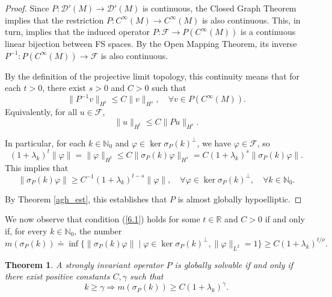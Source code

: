 \documentclass{amsart}
\newtheorem{theorem}{Theorem}[section]
\theoremstyle{definition}
\theoremstyle{remark}
\numberwithin{equation}{section}
\begin{document}
\begin{proof}
		Since $P:\mathscr{D}'(M)\to\mathscr{D}'(M)$ is continuous, the Closed Graph Theorem implies that the restriction $P:C^\infty(M)\to C^\infty(M)$ is also continuous. This, in turn, implies that the induced operator $P:\mathcal{F}\to P(C^\infty(M))$ is a continuous linear bijection between FS spaces. By the Open Mapping Theorem, its inverse  $P^{-1}: P(C^\infty(M))\to\mathcal{F}$ is also continuous.  
		
		By the definition of the projective limit topology, this continuity means that for each $t>0$, there exist $s>0$ and $C>0$ such that
		\begin{equation*}
			\|P^{-1}v\|_{H^t}\leq C\|v\|_{H^s},\quad \forall v\in P(C^\infty(M)).
		\end{equation*}
		Equivalently, for all $u\in\mathcal{F}$,
		\begin{equation*}
			\|u\|_{H^t}\leq C\|Pu\|_{H^s}.
		\end{equation*}
		
		In particular, for each $k\in\mathbb{N}_0$ and $\varphi\in\ker\sigma_P(k)^\perp$, we have $\varphi\in\mathcal{F}$, so
		\begin{equation*}
			(1+\lambda_k)^t\|\varphi\|=\|\varphi\|_{H^t}\leq C\|\sigma_P(k)\varphi\|_{H^s}=C(1+\lambda_k)^s\|\sigma_P(k)\varphi\|.
		\end{equation*}
		This implies that
		\begin{equation*}
			\|\sigma_P(k)\varphi\|\geq C^{-1}(1+\lambda_k)^{t-s}\|\varphi\|,\quad \forall \varphi\in\ker\sigma_P(k)^\perp, \quad \forall k\in\mathbb{N}_0.
		\end{equation*}
		
		By Theorem \ref{agh_est}, this establishes that $P$ is almost globally hypoelliptic.
	\end{proof}
	
	
	We now observe that condition (\ref{6.1}) holds for some $t\in\mathbb{R}$ and $C>0$ if and only if, for every $k\in\mathbb{N}_0$, the number
	\begin{equation*}
		m(\sigma_P(k)) \doteq \inf\{\|\sigma_P(k)\varphi\| \mid \varphi\in\ker\sigma_P(k)^\perp, \|\varphi\|_{L^2} =1\}  \geq C(1+\lambda_k)^{t/\nu}.
	\end{equation*}
	
	\begin{theorem}
		A strongly invariant operator $P$ is globally solvable if and only if there exist positive constants $C,\gamma$ such that
		\begin{equation*}
			k\geq \gamma \Rightarrow m(\sigma_P(k))\geq C(1+\lambda_k)^\gamma.
		\end{equation*}
	\end{theorem}
	
\end{document}
